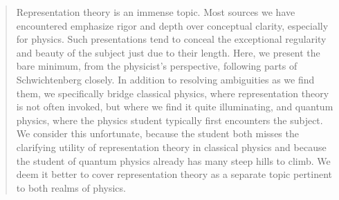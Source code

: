 

%

\begin{abstract} 
\noindent Representation theory is an immense topic. Most sources we have
encountered emphasize rigor and depth over conceptual clarity, especially for
physics. Such presentations tend to conceal the exceptional regularity and
beauty of the subject just due to their length. Here, we present the bare
minimum, from the physicist's perspective, following parts of
Schwichtenberg\cite{schwichtenberg2018} closely. In addition to resolving
ambiguities as we find them, we specifically bridge classical physics, where
representation theory is not often invoked, but where we find it quite
illuminating, and quantum physics, where the physics student typically first
encounters the subject. We consider this unfortunate, because the student both
misses the clarifying utility of representation theory in classical physics and
because the student of quantum physics already has many steep hills to climb.
We deem it better to cover representation theory as a separate topic pertinent
to both realms of physics.
\end{abstract}

